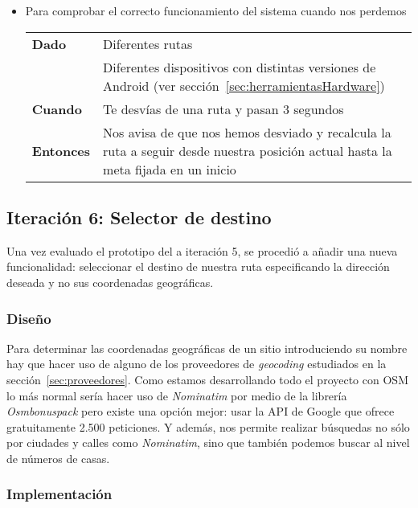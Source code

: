 \begin{itemize}
  \item Para comprobar el correcto funcionamiento del sistema cuando nos perdemos

  \begin{tabular}{p{}p{}}
    \hline
    \textbf{Dado}     & Diferentes rutas \\
                      & Diferentes dispositivos con distintas versiones de Android (ver
                        sección~\ref{sec:herramientasHardware}) \\
    \textbf{Cuando}   & Te desvías de una ruta y pasan 3 segundos \\
    \textbf{Entonces} & Nos avisa de que nos hemos desviado y recalcula la ruta a seguir desde
                        nuestra posición actual hasta la meta fijada en un inicio \\
    \hline
  \end{tabular}
\end{itemize}

\subsection{Iteración 6: Selector de destino}
\label{sec:ite6}

Una vez evaluado el prototipo del a iteración 5, se procedió a añadir una nueva funcionalidad:
seleccionar el destino de nuestra ruta especificando la dirección deseada y no sus coordenadas
geográficas.

\subsubsection{Diseño}

Para determinar las coordenadas geográficas de un sitio introduciendo su nombre hay que hacer uso de
alguno de los proveedores de \emph{geocoding} estudiados en la sección~\ref{sec:proveedores}. Como
estamos desarrollando todo el proyecto con \acs{OSM} lo más normal sería hacer uso de
\emph{Nominatim} por medio de la librería \emph{Osmbonuspack} pero existe una opción mejor: usar la
\acs{API} de Google que ofrece gratuitamente 2.500 peticiones. Y además, nos permite realizar
búsquedas no sólo por ciudades y calles como \emph{Nominatim}, sino que también podemos buscar al
nivel de números de casas.

\subsubsection{Implementación}

